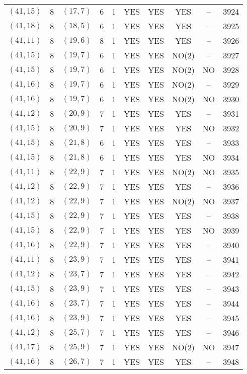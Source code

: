 \begin{longtable}{|c|c|c|c|c|c|c|c|c|c|}
$(41, 15)$ & 8 & $(17, 7)$ & 6 & 1 & YES & YES & YES & -- & 3924\\
$(41, 18)$ & 8 & $(18, 5)$ & 6 & 1 & YES & YES & YES & -- & 3925\\
$(41, 11)$ & 8 & $(19, 6)$ & 8 & 1 & YES & YES & YES & -- & 3926\\
$(41, 15)$ & 8 & $(19, 7)$ & 6 & 1 & YES & YES & NO(2) & -- & 3927\\
$(41, 15)$ & 8 & $(19, 7)$ & 6 & 1 & YES & YES & NO(2) & NO & 3928\\
$(41, 16)$ & 8 & $(19, 7)$ & 6 & 1 & YES & YES & NO(2) & -- & 3929\\
$(41, 16)$ & 8 & $(19, 7)$ & 6 & 1 & YES & YES & NO(2) & NO & 3930\\
$(41, 12)$ & 8 & $(20, 9)$ & 7 & 1 & YES & YES & YES & -- & 3931\\
$(41, 15)$ & 8 & $(20, 9)$ & 7 & 1 & YES & YES & YES & NO & 3932\\
$(41, 15)$ & 8 & $(21, 8)$ & 6 & 1 & YES & YES & YES & -- & 3933\\
$(41, 15)$ & 8 & $(21, 8)$ & 6 & 1 & YES & YES & YES & NO & 3934\\
$(41, 11)$ & 8 & $(22, 9)$ & 7 & 1 & YES & YES & NO(2) & NO & 3935\\
$(41, 12)$ & 8 & $(22, 9)$ & 7 & 1 & YES & YES & YES & -- & 3936\\
$(41, 12)$ & 8 & $(22, 9)$ & 7 & 1 & YES & YES & NO(2) & NO & 3937\\
$(41, 15)$ & 8 & $(22, 9)$ & 7 & 1 & YES & YES & YES & -- & 3938\\
$(41, 15)$ & 8 & $(22, 9)$ & 7 & 1 & YES & YES & YES & NO & 3939\\
$(41, 16)$ & 8 & $(22, 9)$ & 7 & 1 & YES & YES & YES & -- & 3940\\
$(41, 11)$ & 8 & $(23, 9)$ & 7 & 1 & YES & YES & YES & -- & 3941\\
$(41, 12)$ & 8 & $(23, 7)$ & 7 & 1 & YES & YES & YES & -- & 3942\\
$(41, 15)$ & 8 & $(23, 9)$ & 7 & 1 & YES & YES & YES & -- & 3943\\
$(41, 16)$ & 8 & $(23, 7)$ & 7 & 1 & YES & YES & YES & -- & 3944\\
$(41, 16)$ & 8 & $(23, 9)$ & 7 & 1 & YES & YES & YES & -- & 3945\\
$(41, 12)$ & 8 & $(25, 7)$ & 7 & 1 & YES & YES & YES & -- & 3946\\
$(41, 17)$ & 8 & $(25, 9)$ & 7 & 1 & YES & YES & NO(2) & NO & 3947\\
$(41, 16)$ & 8 & $(26, 7)$ & 7 & 1 & YES & YES & YES & -- & 3948\\

\end{longtable}
